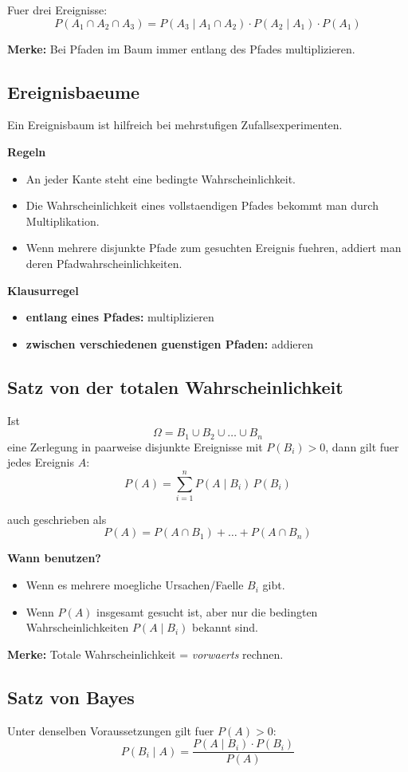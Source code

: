 \documentclass[a4paper,11pt]{article}
\begin{document}
Fuer drei Ereignisse:
\[
P(A_1 \cap A_2 \cap A_3)
=P(A_3\mid A_1 \cap A_2)\cdot P(A_2\mid A_1)\cdot P(A_1)
\]

\textbf{Merke:}
Bei Pfaden im Baum immer entlang des Pfades multiplizieren.

\subsection{Ereignisbaeume}
Ein Ereignisbaum ist hilfreich bei mehrstufigen Zufallsexperimenten.

\textbf{Regeln}
\begin{itemize}
  \item An jeder Kante steht eine bedingte Wahrscheinlichkeit.
  \item Die Wahrscheinlichkeit eines vollstaendigen Pfades bekommt man durch Multiplikation.
  \item Wenn mehrere disjunkte Pfade zum gesuchten Ereignis fuehren, addiert man deren Pfadwahrscheinlichkeiten.
\end{itemize}

\textbf{Klausurregel}
\begin{itemize}
  \item \textbf{entlang eines Pfades:} multiplizieren
  \item \textbf{zwischen verschiedenen guenstigen Pfaden:} addieren
\end{itemize}

\subsection{Satz von der totalen Wahrscheinlichkeit}
Ist
\[
\Omega = B_1 \cup B_2 \cup \dots \cup B_n
\]
eine Zerlegung in paarweise disjunkte Ereignisse mit $P(B_i)>0$, dann gilt fuer jedes Ereignis $A$:
\[
P(A)=\sum_{i=1}^n P(A\mid B_i)\,P(B_i)
\]

auch geschrieben als
\[
P(A)=P(A\cap B_1)+\dots+P(A\cap B_n)
\]

\textbf{Wann benutzen?}
\begin{itemize}
  \item Wenn es mehrere moegliche Ursachen/Faelle $B_i$ gibt.
  \item Wenn $P(A)$ insgesamt gesucht ist, aber nur die bedingten Wahrscheinlichkeiten $P(A\mid B_i)$ bekannt sind.
\end{itemize}

\textbf{Merke:}
Totale Wahrscheinlichkeit = \emph{vorwaerts} rechnen.

\subsection{Satz von Bayes}
Unter denselben Voraussetzungen gilt fuer $P(A)>0$:
\[
P(B_i\mid A)=\frac{P(A\mid B_i)\cdot P(B_i)}{P(A)}
\]
\end{document}
